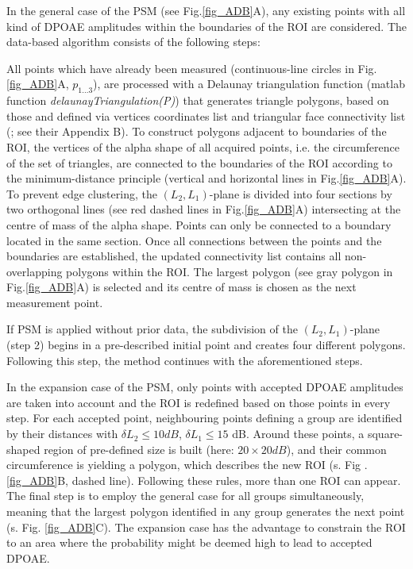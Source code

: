 \documentclass[journal,twoside,web]{ieeecolor2}
\begin{document}
In the general case of the PSM (see Fig.\ref{fig_ADB}A), any existing points with all kind of DPOAE amplitudes within the boundaries of the ROI are considered.
The data-based algorithm consists of the following steps:
\begin{algorithmic}[1]
\STATE All points which have already been measured (continuous-line circles in Fig.\ref{fig_ADB}A, $p_{1...3}$), are processed with a Delaunay triangulation function (matlab function \textit{delaunayTriangulation(P)}) that generates triangle polygons, based on those and defined via vertices coordinates list and triangular face connectivity list (\cite{LS1980}; see their Appendix B).
\STATE To construct polygons adjacent to boundaries of the ROI, the vertices of the alpha shape of all acquired points, i.e. the circumference of the set of triangles, are connected to the boundaries of the ROI according to the minimum-distance principle (vertical and horizontal lines in Fig.\ref{fig_ADB}A).
To prevent edge clustering, the $(L_2, L_1)$-plane is divided into four sections by two orthogonal lines (see red dashed lines in Fig.\ref{fig_ADB}A) intersecting at the centre of mass of the alpha shape.
Points can only be connected to a boundary located in the same section.
\STATE Once all connections between the points and the boundaries are established, the updated connectivity list contains all non-overlapping polygons within the ROI.
The largest polygon (see gray polygon in Fig.\ref{fig_ADB}A) is selected and its centre of mass is chosen as the next measurement point.
\end{algorithmic} 

If PSM is applied without prior data, the subdivision of the $(L_2, L_1)$-plane (step 2) begins in a pre-described initial point and creates four different polygons.
Following this step, the method continues with the aforementioned steps.

In the expansion case of the PSM, only points with accepted DPOAE amplitudes are taken into account and the ROI is redefined based on those points in every step.
For each accepted point, neighbouring points defining a group are identified by their distances with $\delta L_2 \le 10 dB$, $\delta L_1 \le 15$ dB.
Around these points, a square-shaped region of pre-defined size is built (here: $20 \times 20 dB$), and their common circumference is yielding a polygon, which describes the new ROI (s. Fig .\ref{fig_ADB}B, dashed line).
Following these rules, more than one ROI can appear.
The final step is to employ the general case for all groups simultaneously, meaning that the largest polygon identified in any group generates the next point (s. Fig. \ref{fig_ADB}C).
The expansion case has the advantage to constrain the ROI to an area where the probability might be deemed high to lead to accepted DPOAE.
\end{document}
